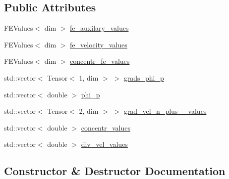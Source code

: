 \subsection*{Public Attributes}
\begin{DoxyCompactItemize}
\item 
F\+E\+Values$<$ dim $>$ \hyperlink{struct_assembly_1_1_scratch_1_1projection__step_a3b5a0afe1eaf675d173af8ffd7663e29}{fe\+\_\+auxilary\+\_\+values}
\item 
F\+E\+Values$<$ dim $>$ \hyperlink{struct_assembly_1_1_scratch_1_1projection__step_af91b8e433a9a308d66f5cbdbc2dd5a7b}{fe\+\_\+velocity\+\_\+values}
\item 
F\+E\+Values$<$ dim $>$ \hyperlink{struct_assembly_1_1_scratch_1_1projection__step_afeebd89eb59befac5386d69841c490b0}{concentr\+\_\+fe\+\_\+values}
\item 
std\+::vector$<$ Tensor$<$ 1, dim $>$ $>$ \hyperlink{struct_assembly_1_1_scratch_1_1projection__step_a75ecf1c6d8aa564824cc3b3376ca08f9}{grads\+\_\+phi\+\_\+p}
\item 
std\+::vector$<$ double $>$ \hyperlink{struct_assembly_1_1_scratch_1_1projection__step_a766727128326d33ecd414c713f186540}{phi\+\_\+p}
\item 
std\+::vector$<$ Tensor$<$ 2, dim $>$ $>$ \hyperlink{struct_assembly_1_1_scratch_1_1projection__step_abc3d9d363dff0cc1bbf8631afc2c777a}{grad\+\_\+vel\+\_\+n\+\_\+plus\+\_\+\_\+values}
\item 
std\+::vector$<$ double $>$ \hyperlink{struct_assembly_1_1_scratch_1_1projection__step_a7907e0ef2eddf65f20a86cc8afff9b66}{concentr\+\_\+values}
\item 
std\+::vector$<$ double $>$ \hyperlink{struct_assembly_1_1_scratch_1_1projection__step_a65701cc9156422035628e7a65783587f}{div\+\_\+vel\+\_\+values}
\end{DoxyCompactItemize}


\subsection{Constructor \& Destructor Documentation}
\hypertarget{struct_assembly_1_1_scratch_1_1projection__step_ab68aa92ddfce17896f9bb3088cd707fc}{}

